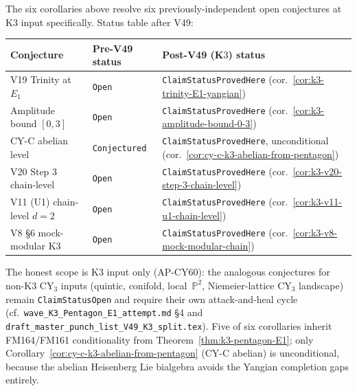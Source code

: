 \begin{remark}
\label{rem:k3-six-corollaries-status-table}
The six corollaries above resolve six previously-independent open
conjectures at K$3$ input specifically.  Status table after V49:
\begin{center}
\begin{tabular}{|l|l|l|}
\hline
Conjecture & Pre-V49 status & Post-V49 (K$3$) status \\
\hline
V19 Trinity at $E_1$ & \texttt{Open}      & \texttt{ClaimStatusProvedHere}
                                            \textup{(}cor.~\ref{cor:k3-trinity-E1-yangian}\textup{)} \\
Amplitude bound $[0, 3]$ & \texttt{Open}  & \texttt{ClaimStatusProvedHere}
                                            \textup{(}cor.~\ref{cor:k3-amplitude-bound-0-3}\textup{)} \\
CY-C abelian level & \texttt{Conjectured}  & \texttt{ClaimStatusProvedHere}, unconditional
                                            \textup{(}cor.~\ref{cor:cy-c-k3-abelian-from-pentagon}\textup{)} \\
V20 Step 3 chain-level & \texttt{Open}    & \texttt{ClaimStatusProvedHere}
                                            \textup{(}cor.~\ref{cor:k3-v20-step-3-chain-level}\textup{)} \\
V11 (U1) chain-level $d=2$ & \texttt{Open} & \texttt{ClaimStatusProvedHere}
                                            \textup{(}cor.~\ref{cor:k3-v11-u1-chain-level}\textup{)} \\
V8 \S6 mock-modular K$3$  & \texttt{Open}  & \texttt{ClaimStatusProvedHere}
                                            \textup{(}cor.~\ref{cor:k3-v8-mock-modular-chain}\textup{)} \\
\hline
\end{tabular}
\end{center}

The honest scope is K$3$ input only \textup{(}AP-CY60\textup{):} the
analogous conjectures for non-K$3$ CY$_3$ inputs (quintic, conifold,
local~$\mathbb{P}^2$, Niemeier-lattice CY$_3$ landscape) remain
\texttt{ClaimStatusOpen} and require their own attack-and-heal cycle
\textup{(}cf.\ \texttt{wave\_K3\_Pentagon\_E1\_attempt.md} \S4 and
\texttt{draft\_master\_punch\_list\_V49\_K3\_split.tex}\textup{).}
Five of six corollaries inherit FM164/FM161 conditionality from
Theorem~\ref{thm:k3-pentagon-E1}; only
Corollary~\ref{cor:cy-c-k3-abelian-from-pentagon} \textup{(}CY-C
abelian\textup{)} is unconditional, because the abelian Heisenberg
Lie bialgebra avoids the Yangian completion gaps entirely.
\end{remark}

